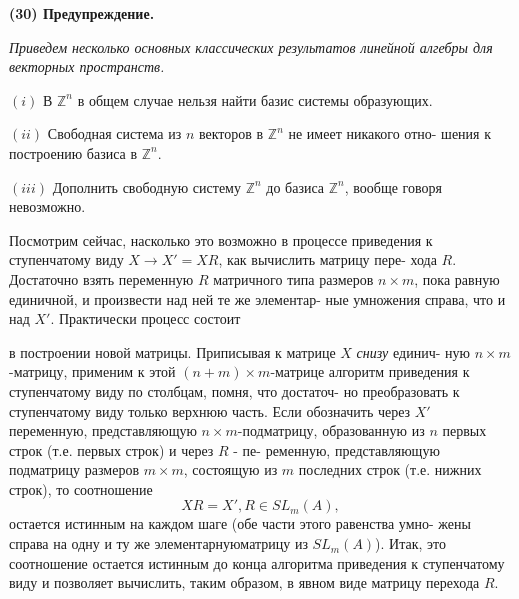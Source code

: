 \documentclass{mai_book}
\begin{document}
	\noindent
	{\bf (30) Предупреждение.}
	
	{\it Приведем несколько основных классических результатов линейной\linebreak
	алгебры для векторных пространств.
	
	$(i)$ В ${\mathbb Z}^n$ в общем случае нельзя найти базис системы образующих.
	
	$(ii)$ Свободная система из $n$ векторов в ${\mathbb Z}^n$ не имеет никакого отно-\linebreak
	шения к построению базиса в ${\mathbb Z}^n$.
	
	$(iii)$ Дополнить свободную систему ${\mathbb Z}^n$ до базиса ${\mathbb Z}^n$, вообще говоря\linebreak
	невозможно.}

	Посмотрим сейчас, насколько это возможно в процессе приведения\linebreak
	к ступенчатому виду $X \rightarrow X' = XR$, как вычислить матрицу пере-\linebreak
	хода $R$. Достаточно взять переменную $R$ матричного типа размеров\linebreak
	$n\times m$, пока равную единичной, и произвести над ней те же элементар-\linebreak
	ные умножения справа, что и над $X'$. Практически процесс состоит\linebreak
	
	\pagebreak
	
	
	\noindent
	в построении новой матрицы. Приписывая к матрице $X$ {\it снизу} единич-\linebreak
	ную $n\times m$-матрицу, применим к этой $(n + m) \times m$-матрице алгоритм\linebreak
	приведения к ступенчатому виду по столбцам, помня, что достаточ-\linebreak
	но преобразовать к ступенчатому виду только верхнюю часть. Если\linebreak
	обозначить через $X'$ переменную, представляющую $n\times m$-подматрицу,\linebreak
	образованную из $n$ первых строк (т.е. первых строк) и через $R$ - пе-\linebreak
	ременную, представляющую подматрицу размеров $m\times m$, состоящую\linebreak
	из $m$ последних строк (т.е. нижних строк), то соотношение\linebreak
	$$XR = X', R \in SL_{m}(A),$$
	остается истинным на каждом шаге (обе части этого равенства умно-\linebreak
	жены справа на одну и ту же элементарнуюматрицу из $SL_{m}(A)$). Итак,\linebreak
	это соотношение остается истинным до конца алгоритма приведения к\linebreak
	ступенчатому виду и позволяет вычислить, таким образом, в явном\linebreak
	виде матрицу перехода $R$.
	
\end{document}
